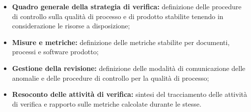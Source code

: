 \documentclass[../NormediProgetto.tex]{subfiles}
\begin{document}
\begin{itemize}
    \item \textbf{Quadro generale della strategia di verifica:} definizione delle procedure di controllo sulla qualità di processo e di prodotto stabilite tenendo in considerazione le risorse a disposizione;
    
    \item \textbf \textbf{Misure e metriche:} definizione delle metriche stabilite per documenti, processi e software prodotto;
    
    \item \textbf{Gestione della revisione:} definizione delle modalità di comunicazione delle anomalie e delle procedure di controllo per la qualità di processo;
    
    \item \textbf{Resoconto delle attività di verifica:} sintesi del tracciamento delle attività di verifica e rapporto sulle metriche calcolate durante le stesse.
\end{itemize}
\end{document}
